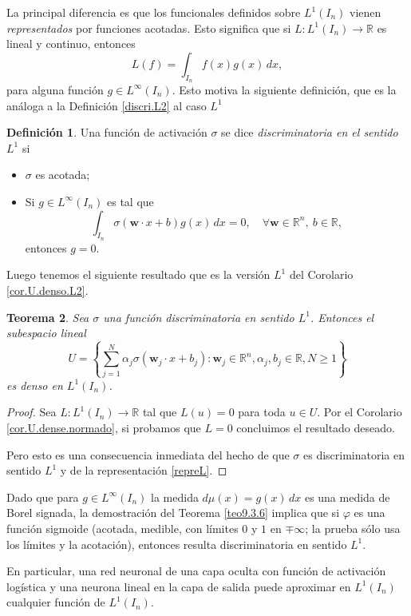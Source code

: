 \documentclass[12pt, a4paper]{amsbook}
\newcommand{\R}{{\mathbb R}}
\newcommand{\ww}{{\mathbf w}}
\newtheorem{teo}{Teorema}[section]
\theoremstyle{remark}
\theoremstyle{definition}
\newtheorem{defi}[teo]{Definici\'on}
\numberwithin{section}{chapter}
\numberwithin{subsection}{section}
\numberwithin{equation}{section}
\numberwithin{figure}{chapter}
\begin{document}
La principal diferencia es que los funcionales definidos sobre $L^1(I_n)$ vienen {\em representados} por funciones acotadas. Esto significa que si $L\colon L^1(I_n)\to\R$ es lineal y continuo, entonces
\begin{equation}\label{repreL}
L(f) = \int_{I_n} f(x) g(x)\, dx,
\end{equation}
para alguna función $g\in L^\infty(I_n)$. Esto motiva la siguiente definición, que es la análoga a la Definición \ref{discri.L2} al caso $L^1$
\begin{defi}\label{discri.L1}
Una función de activación $\sigma$ se dice {\em discriminatoria en el sentido $L^1$} si
\begin{itemize}
\item[(i)] $\sigma$ es acotada;
\item[(ii)] Si $g\in L^\infty(I_n)$ es tal que
$$
\int_{I_n} \sigma(\ww\cdot x + b) g(x)\, dx=0,\quad \forall \ww\in\R^n,\ b\in\R,
$$
entonces $g=0$.
\end{itemize}
\end{defi}

Luego tenemos el siguiente resultado que es la versión $L^1$ del Corolario \ref{cor.U.denso.L2}.
\begin{teo}
Sea $\sigma$ una función discriminatoria en sentido $L^1$. Entonces el subespacio lineal
$$
U = \left\{ \sum_{j=1}^N \alpha_j \sigma(\ww_j \cdot x + b_j)\colon \ww_j\in\R^n, \alpha_j, b_j\in\R, N\ge 1\right\}
$$
es denso en $L^1(I_n)$.
\end{teo}

\begin{proof}
Sea $L\colon L^1(I_n)\to \R$ tal que $L(u)=0$ para toda $u\in U$. Por el Corolario \ref{cor.U.dense.normado}, si probamos que $L=0$ concluimos el resultado deseado.

Pero esto es una consecuencia inmediata del hecho de que $\sigma$ es discriminatoria en sentido $L^1$ y de la representación \eqref{repreL}.
\end{proof}

Dado que para $g\in L^\infty(I_n)$ la medida $d\mu(x) = g(x)\, dx$ es una medida de Borel signada, la demostración del Teorema \ref{teo9.3.6} implica que si $\varphi$ es una función sigmoide (acotada, medible, con límites $0$ y $1$ en $\mp\infty$; la prueba sólo usa los límites y la acotación), entonces resulta discriminatoria en sentido $L^1$.

En particular, una red neuronal de una capa oculta con función de activación logística y una neurona lineal en la capa de salida puede aproximar en $L^1(I_n)$ cualquier función de $L^1(I_n)$.
\end{document}

